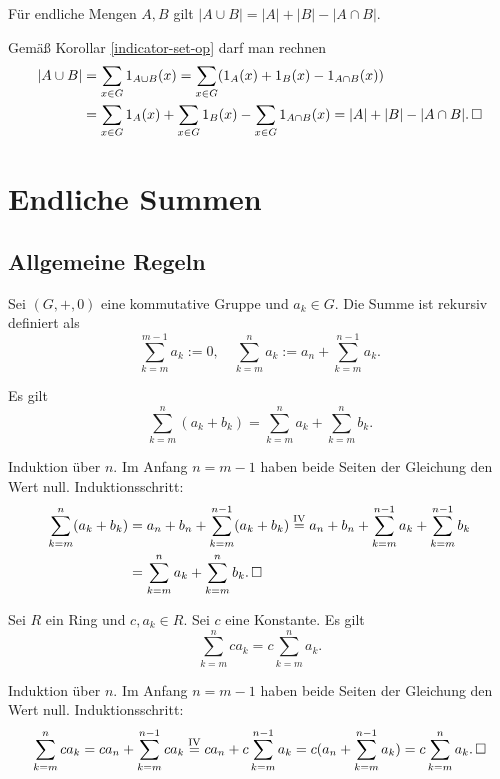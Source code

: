 \begin{Satz}
Für endliche Mengen $A,B$ gilt $|A\cup B| = |A|+|B|-|A\cap B|$.
\end{Satz}
\begin{Beweis}
Gemäß Korollar \ref{indicator-set-op} darf man rechnen
\begin{align*}
|A\cup B| &= \sum_{x\in G} 1_{A\cup B}(x)
= \sum_{x\in G} (1_A(x) + 1_B(x) - 1_{A\cap B}(x))\\
&= \sum_{x\in G} 1_A(x) + \sum_{x\in G} 1_B(x) - \sum_{x\in G} 1_{A\cap B}(x)
= |A| + |B| - |A\cap B|.\,\square
\end{align*}
\end{Beweis}

\newpage
\section{Endliche Summen}

\subsection{Allgemeine Regeln}

\begin{Definition}[Summe]
Sei $(G,+,0)$ eine kommutative Gruppe und $a_k\in G$. Die Summe ist
rekursiv definiert als
\[\sum_{k=m}^{m-1} a_k := 0,\quad \sum_{k=m}^n a_k
:= a_n + \sum_{k=m}^{n-1} a_k.\]
\end{Definition}

\begin{Korollar}\label{sum-add}
Es gilt
\[\sum_{k=m}^n (a_k + b_k) = \sum_{k=m}^n a_k + \sum_{k=m}^n b_k.\]
\end{Korollar}
\begin{Beweis} Induktion über $n$. Im Anfang $n=m-1$ haben
beide Seiten der Gleichung den Wert null. Induktionsschritt:
\begin{align*}
\sum_{k=m}^n (a_k+b_k) &= a_n + b_n + \sum_{k=m}^{n-1} (a_k+b_k)
\stackrel{\mathrm{IV}}= a_n + b_n + \sum_{k=m}^{n-1} a_k + \sum_{k=m}^{n-1} b_k\\
&= \sum_{k=m}^n a_k + \sum_{k=m}^n b_k.\,\square
\end{align*}
\end{Beweis}

\begin{Korollar}\label{sum-scale}
Sei $R$ ein Ring und $c,a_k\in R$. Sei $c$ eine
Konstante. Es gilt
\[\sum_{k=m}^n ca_k = c\sum_{k=m}^n a_k.\]
\end{Korollar}
\begin{Beweis} Induktion über $n$. Im Anfang $n=m-1$ haben beide
Seiten der Gleichung den Wert null. Induktionsschritt:
\[\sum_{k=m}^n ca_k = ca_n + \sum_{k=m}^{n-1} ca_k
\stackrel{\mathrm{IV}}= ca_n + c\sum_{k=m}^{n-1} a_k
= c(a_n + \sum_{k=m}^{n-1} a_k) = c\sum_{k=m}^n a_k.\,\square\]
\end{Beweis}

